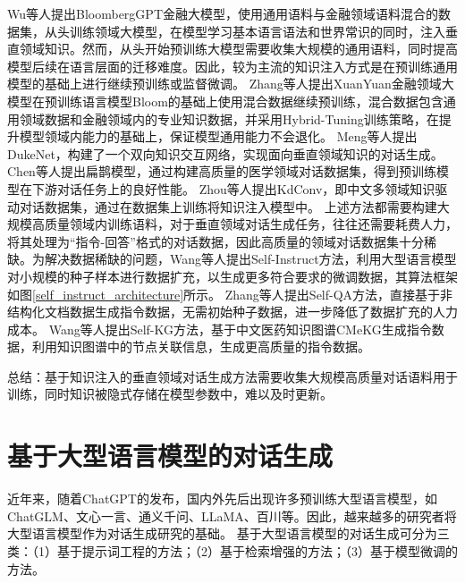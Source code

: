 Wu等人\cite{DBLP:journals/corr/abs-2303-17564}提出BloombergGPT金融大模型，使用通用语料与金融领域语料混合的数据集，从头训练领域大模型，在模型学习基本语言语法和世界常识的同时，注入垂直领域知识。然而，从头开始预训练大模型需要收集大规模的通用语料，同时提高模型后续在语言层面的迁移难度。因此，较为主流的知识注入方式是在预训练通用模型的基础上进行继续预训练或监督微调。
Zhang等人\cite{DBLP:conf/cikm/ZhangY23}提出XuanYuan金融领域大模型在预训练语言模型Bloom的基础上使用混合数据继续预训练，混合数据包含通用领域数据和金融领域内的专业知识数据，并采用Hybrid-Tuning训练策略，在提升模型领域内能力的基础上，保证模型通用能力不会退化。
Meng等人\cite{DBLP:conf/sigir/MengRCSRTR20}提出DukeNet，构建了一个双向知识交互网络，实现面向垂直领域知识的对话生成。
Chen等人\cite{DBLP:journals/corr/abs-2310-15896}提出扁鹊模型，通过构建高质量的医学领域对话数据集，得到预训练模型在下游对话任务上的良好性能。
Zhou等人\cite{DBLP:conf/acl/ZhouZHHZ20}提出KdConv，即中文多领域知识驱动对话数据集，通过在数据集上训练将知识注入模型中。
上述方法都需要构建大规模高质量领域内训练语料，对于垂直领域对话生成任务，往往还需要耗费人力，将其处理为“指令-回答”格式的对话数据，因此高质量的领域对话数据集十分稀缺。为解决数据稀缺的问题，Wang等人\cite{DBLP:conf/acl/WangKMLSKH23}提出Self-Instruct方法，利用大型语言模型对小规模的种子样本进行数据扩充，以生成更多符合要求的微调数据，其算法框架如图\ref{self_instruct_architecture}所示。
Zhang等人\cite{DBLP:journals/corr/abs-2305-11952}提出Self-QA方法，直接基于非结构化文档数据生成指令数据，无需初始种子数据，进一步降低了数据扩充的人力成本。
Wang等人\cite{DBLP:journals/corr/abs-2304-06975}提出Self-KG方法，基于中文医药知识图谱CMeKG生成指令数据，利用知识图谱中的节点关联信息，生成更高质量的指令数据。

总结：基于知识注入的垂直领域对话生成方法需要收集大规模高质量对话语料用于训练，同时知识被隐式存储在模型参数中，难以及时更新。

\section{基于大型语言模型的对话生成}

近年来，随着ChatGPT\cite{DBLP:conf/nips/Ouyang0JAWMZASR22}的发布，国内外先后出现许多预训练大型语言模型，如ChatGLM\cite{DBLP:conf/iclr/ZengLDWL0YXZXTM23}、文心一言\cite{DBLP:journals/corr/abs-2107-02137}、通义千问\cite{DBLP:journals/corr/abs-2309-16609}、LLaMA\cite{DBLP:journals/corr/abs-2302-13971}、百川\cite{DBLP:journals/corr/abs-2309-10305}等。因此，越来越多的研究者将大型语言模型作为对话生成研究的基础。
基于大型语言模型的对话生成可分为三类：（1）基于提示词工程的方法；（2）基于检索增强的方法；（3）基于模型微调的方法。

